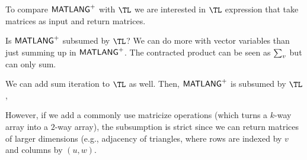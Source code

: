To compare $\mathsf{MATLANG}^{\sf +}$ with $\TL$ we are interested in $\TL$ expression  that take matrices as input and return matrices.

Is $\mathsf{MATLANG}^{\sf +}$  subsumed by $\TL$? We can do more with vector variables than just summing up in $\mathsf{MATLANG}^{\sf +}$. The contracted product
can be seen as $\sum_{v}$ but can only sum.

We can add sum iteration to $\TL$ as well. Then, $\mathsf{MATLANG}^{\sf +}$ is subsumed by $\TL$,

However, if we add a commonly use matricize operations (which turns a $k$-way array into a $2$-way array), the subsumption
is strict since we can return matrices of larger dimensions (e.g., adjacency of triangles, where rows are indexed by $v$ and columns
by $(u,w)$.











%
%		


%
%







